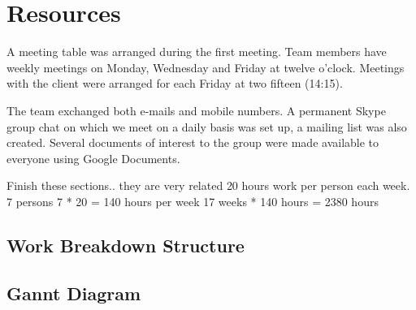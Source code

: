 \newpage
\section{Resources}
A meeting table was arranged during the first meeting. Team members
have weekly meetings on Monday, Wednesday and Friday at twelve o'clock.
Meetings with the client were arranged for each Friday at two fifteen (14:15).

The team exchanged both e-mails and mobile numbers. A permanent Skype
group chat on which we meet on a daily basis was set up, a mailing
list was also created. Several documents of interest to the group
were made available to everyone using Google Documents.

\todo
{
 Finish these sections.. they are very related
}
20 hours work per person each week.
7 persons
7 * 20 = 140 hours per week
17 weeks * 140 hours = 2380 hours

\subsection{Work Breakdown Structure}


\subsection{Gannt Diagram}

